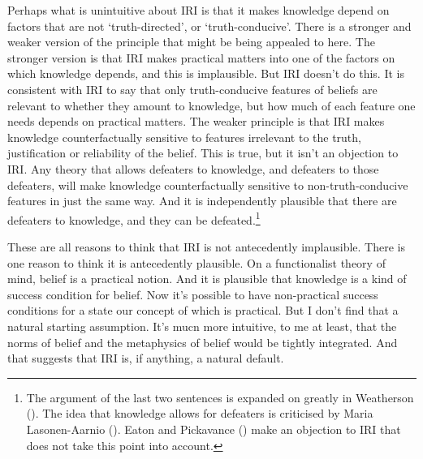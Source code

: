 \documentclass[
  10pt,
  letterpaper,
  DIV=11,
  numbers=noendperiod,
  twoside]{scrartcl}
\begin{document}
Perhaps what is unintuitive about IRI is that it makes knowledge depend
on factors that are not `truth-directed', or `truth-conducive'. There is
a stronger and weaker version of the principle that might be being
appealed to here. The stronger version is that IRI makes practical
matters into one of the factors on which knowledge depends, and this is
implausible. But IRI doesn't do this. It is consistent with IRI to say
that only truth-conducive features of beliefs are relevant to whether
they amount to knowledge, but how much of each feature one needs depends
on practical matters. The weaker principle is that IRI makes knowledge
counterfactually sensitive to features irrelevant to the truth,
justification or reliability of the belief. This is true, but it isn't
an objection to IRI. Any theory that allows defeaters to knowledge, and
defeaters to those defeaters, will make knowledge counterfactually
sensitive to non-truth-conducive features in just the same way. And it
is independently plausible that there are defeaters to knowledge, and
they can be defeated.\footnote{The argument of the last two sentences is
  expanded on greatly in Weatherson
  (). The idea that
  knowledge allows for defeaters is criticised by Maria Lasonen-Aarnio
  (). Eaton and Pickavance
  () make an objection to IRI
  that does not take this point into account.}

These are all reasons to think that IRI is not antecedently implausible.
There is one reason to think it is antecedently plausible. On a
functionalist theory of mind, belief is a practical notion. And it is
plausible that knowledge is a kind of success condition for belief. Now
it's possible to have non-practical success conditions for a state our
concept of which is practical. But I don't find that a natural starting
assumption. It's mucn more intuitive, to me at least, that the norms of
belief and the metaphysics of belief would be tightly integrated. And
that suggests that IRI is, if anything, a natural default.
\end{document}
